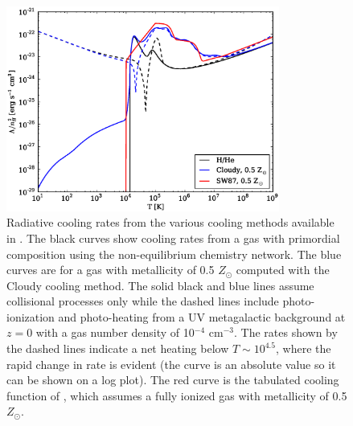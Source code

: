 \begin{figure}
  \begin{center}
    \includegraphics[width=0.8\textwidth]{figures/cooling_rate.eps}
  \end{center}
  \caption{Radiative cooling rates from the various cooling methods
    available in \enzo.  The black curves show cooling rates from a gas
    with primordial composition using the non-equilibrium chemistry
    network.  The blue curves are for a gas with metallicity of 0.5
    $Z_{\odot}$ computed with the Cloudy cooling method.  The solid
    black and blue lines assume collisional processes only while the
    dashed lines include photo-ionization and photo-heating from a UV
    metagalactic background at $z = 0$ with a gas number density of
    10$^{-4}$ cm$^{-3}$.  The rates shown by the
    dashed lines indicate a net heating below $T \sim 10^{4.5}$, where
    the rapid change in rate is evident (the curve is an absolute
    value so it can be shown on a log plot).  The red curve is the
    tabulated cooling function of \citet{SW87}, which assumes a fully
    ionized gas with metallicity of 0.5 $Z_{\odot}$.}
  \label{fig.cooling_rate}
\end{figure}
